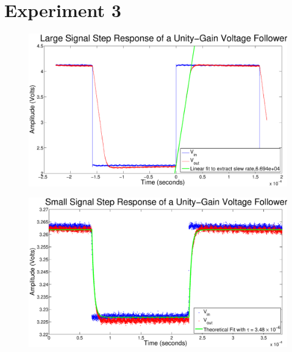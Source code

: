 \section*{Experiment 3}

\begin{figure}[H]
\centering
\includegraphics[width=\linewidth]{../Figures/Exp3P1.eps}
\caption{}
\label{fig:exp3p1}
\end{figure}

\begin{figure}[H]
\centering
\includegraphics[width=\linewidth]{../Figures/Exp3P2.eps}
\caption{}
\label{fig:exp3p2}
\end{figure}
